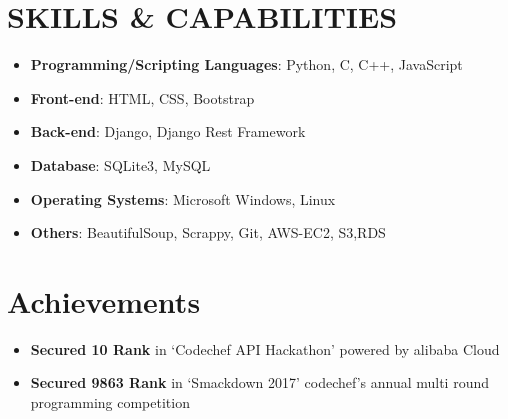 \documentclass[a4paper,1pt]{article}
\begin{document}
\section{SKILLS & CAPABILITIES}
\begin{itemize}
\item \textbf{Programming/Scripting Languages}: Python, C, C++, JavaScript
\item \textbf{Front-end}: HTML, CSS, Bootstrap
\item \textbf{Back-end}: Django, Django Rest Framework
\item \textbf{Database}: SQLite3, MySQL
\item \textbf{Operating Systems}: Microsoft Windows, Linux
\item \textbf{Others}: BeautifulSoup, Scrappy, Git, AWS-EC2, S3,RDS
\end{itemize}




\section{Achievements}{\raggedbottom}
\begin{itemize}
\item \textbf{Secured 10 Rank} in ‘Codechef API Hackathon' powered by alibaba Cloud
\item \textbf{Secured 9863 Rank} in ‘Smackdown 2017' codechef's annual multi round programming competition
\end{itemize}
\end{document}
